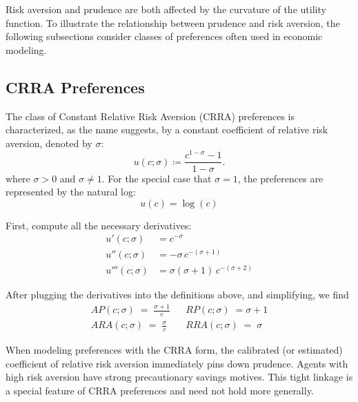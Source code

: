 \documentclass[11pt]{article}
\begin{document}
Risk aversion and prudence are both affected by the curvature of the utility function. To illustrate the relationship between prudence and risk aversion, the following subsections consider classes of preferences often used in economic modeling.

\subsection{CRRA Preferences}
The class of Constant Relative Risk Aversion (CRRA) preferences is characterized, as the name suggests, by a constant coefficient of relative risk aversion, denoted by $\sigma$:
\begin{equation}
u(c; \sigma) \coloneqq \frac{c^{1-\sigma}-1}{1-\sigma}.
\end{equation}
where $\sigma > 0$ and $\sigma \neq 1$. For the special case that $\sigma = 1$, the preferences are represented by the natural log:
\[
u(c) = \log(c)
\]

First, compute all the necessary derivatives:
\begin{align*}
u'(c; \sigma)  &= c^{-\sigma} \\
u''(c; \sigma) &= -\sigma\,c^{-(\sigma+1)} \\
u'''(c; \sigma) &= \sigma(\sigma+1)\,c^{-(\sigma+2)}
\end{align*}

After plugging the derivatives into the definitions above, and simplifying, we find
\begin{align*}
    AP(c; \sigma) \;=\; \frac{\sigma + 1}{c} && RP(c; \sigma) \;= \sigma + 1 \\
    ARA(c; \sigma) \;=\; \frac{\sigma}{c} && RRA(c; \sigma) \;=\; \sigma
\end{align*}

When modeling preferences with the CRRA form, the calibrated (or estimated) coefficient of relative risk aversion immediately pins down prudence. Agents with high risk aversion have strong precautionary savings motives. This tight linkage is a special feature of CRRA preferences and need not hold more generally.
\end{document}
